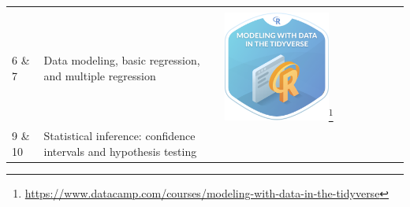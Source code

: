 \documentclass[12pt, krantz2,]{krantz}
\renewcommand{\href}[2]{#2\footnote{\url{#1}}}
\begin{document}
\begin{longtable}[]{@{}lll@{}}
\begin{minipage}[t]{0.30\columnwidth}
\end{minipage}\tabularnewline
\begin{minipage}[t]{0.30\columnwidth}\raggedright
6 \& 7\strut
\end{minipage} & \begin{minipage}[t]{0.30\columnwidth}\raggedright
Data modeling, basic regression, and multiple regression\strut
\end{minipage} & \begin{minipage}[t]{0.30\columnwidth}\raggedright
\href{https://www.datacamp.com/courses/modeling-with-data-in-the-tidyverse}{\includegraphics[width=0.6\textwidth]{images/datacamp_intro_to_modeling.png}}\strut
\end{minipage}\tabularnewline
\begin{minipage}[t]{0.30\columnwidth}\raggedright
9 \& 10\strut
\end{minipage} & \begin{minipage}[t]{0.30\columnwidth}\raggedright
Statistical inference: confidence intervals and hypothesis testing\strut
\end{minipage} & \begin{minipage}[t]{0.30\columnwidth}\raggedright

\end{minipage}
\end{longtable}
\end{document}
